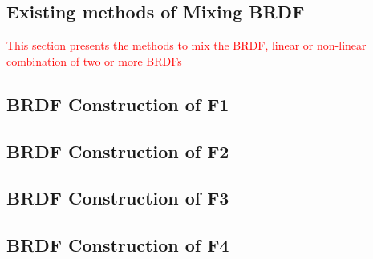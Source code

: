 \subsection{Existing methods of Mixing BRDF}

\textcolor{red}{This section presents the methods to mix the BRDF, linear or non-linear combination of two or more BRDFs}

\subsection{BRDF Construction of F1}


\subsection{BRDF Construction of F2}

\subsection{BRDF Construction of F3}

\subsection{BRDF Construction of F4}